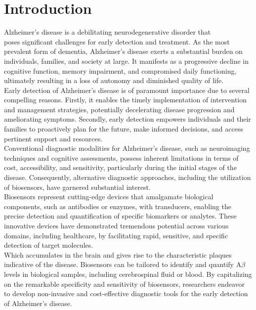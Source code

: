 \section{Introduction}
Alzheimer's disease is a debilitating neurodegenerative disorder that \\poses significant challenges for early detection and treatment\cite{smith2020}. 
As the most prevalent form of dementia, 
Alzheimer's disease exerts a substantial burden on individuals, 
families, 
and society at large\cite{alzassociation2019}. 
It manifests as a progressive decline in cognitive function, 
memory impairment, 
and compromised daily functioning, 
ultimately resulting in a loss of autonomy and diminished quality of life\cite{mckhann2011}.\\

Early detection of Alzheimer's disease is of paramount importance due to several compelling reasons. 
Firstly, 
it enables the timely implementation of intervention and management strategies, 
potentially decelerating disease progression and ameliorating symptoms\cite{livingston2020}. 
Secondly, 
early detection empowers individuals and their families to proactively plan for the future, 
make informed decisions, 
and access pertinent support and resources\cite{karlawish2011}.\\

Conventional diagnostic modalities for Alzheimer's disease, 
such as neuroimaging techniques and cognitive assessments, 
possess inherent limitations in terms of cost, 
accessibility, 
and sensitivity, 
particularly during the initial stages of the disease\cite{dubois2014}. 
Consequently, 
alternative diagnostic approaches, 
including the utilization of biosensors, 
have garnered substantial interest\cite{nguyen2017}.\\

Biosensors represent cutting-edge devices that amalgamate biological components, 
such as antibodies or enzymes, 
with transducers, 
enabling the precise detection and quantification of specific biomarkers or analytes\cite{turner1987}. 
These innovative devices have demonstrated tremendous potential across various domains, 
including healthcare, 
by facilitating rapid, 
sensitive, 
and specific detection of target molecules\cite{lange2008}.\\

Which accumulates in the brain and gives rise to the characteristic plaques indicative of the disease\cite{hardy1992}. 
Biosensors can be tailored to identify and quantify A$\beta$
levels in biological samples, 
including cerebrospinal fluid or blood\cite{soares2019}. 
By capitalizing on the remarkable specificity and sensitivity of biosensors, 
researchers endeavor to develop non-invasive and cost-effective diagnostic tools for the early detection of Alzheimer's disease\cite{manfredsson2020}.\\

